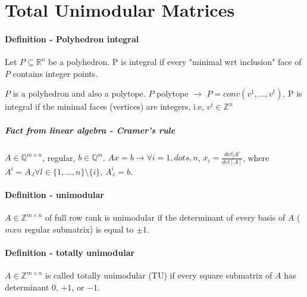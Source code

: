 \documentclass[main]{subfiles}
\begin{document}

\section{Total Unimodular Matrices}

\paragraph{Definition - Polyhedron integral} Let $P \subseteq \mathbb{R}^{n}$ be a polyhedron. P is integral if every "minimal wrt inclusion" face of $P$ contains integer points.

$P$ is a polyhedron and also a polytope. $P$ polytope $\rightarrow$ $P = conv(v^{1}, \dots, v^{t})$.
P is integral if the minimal faces (vertices) are integers, i.e, $v^{i} \in \mathbb{Z}^{n}$

\subparagraph{Fact from linear algebra - Cramer's rule}
$A \in \mathbb{Q}^{m \times n}$, regular, $b \in \mathbb{Q}^{m}$. $Ax = b \rightarrow \forall i = 1, dots, n$, $x_{i} = \frac{det[A^{i}}{det[A]}$, where $A^{i} = A_{\cdot l} \forall l \in \{1, \dots, n \} \setminus \{i\}$, $A^{i}_{\cdot i} = b$.

\paragraph{Definition - unimodular}
$A \in \mathbb{Z}^{m \times n}$ of full row rank is unimodular if the determinant of every basis of $A$ ($mxn$ regular submatrix) is equal to $\pm 1$.

\paragraph{Definition - totally unimodular}
$A \in \mathbb{Z}^{m \times n}$ is called totally unimodular (TU) if every square submatrix of $A$ has determinant $0$, $+1$, or $-1$.
\end{document}
